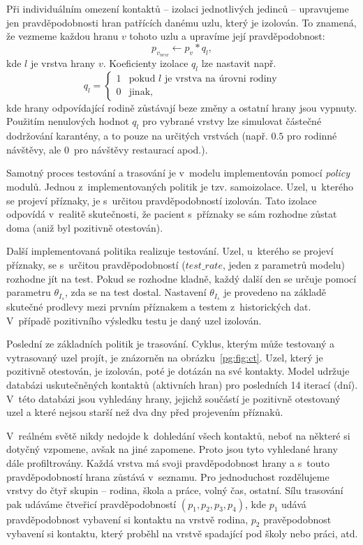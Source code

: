 Při individuálním omezení kontaktů -- izolaci jednotlivých jedinců -- upravujeme jen
pravděpodobnosti hran patřících danému uzlu, který je izolován. To znamená, že
vezmeme každou hranu $v$ tohoto uzlu a upravíme její pravděpodobnost:
$$
p_{v_{new}} \leftarrow p_{v} * q_l,
$$
kde  $l$  je vrstva hrany  $v$. 
Koeficienty izolace $q_l$ lze nastavit např.
$$
q_l =
\begin{cases}
  1  &  \mbox{pokud } l \mbox{ je vrstva na úrovni rodiny} \\
  0  &  \mbox{jinak,}
\end{cases}
$$
kde hrany odpovídající rodině zůstávají beze změny a ostatní hrany jsou vypnuty. Použitím nenulových hodnot $q_l$ pro vybrané vrstvy lze simulovat částečné dodržování karantény, a to pouze na určitých vrstvách (např. $0.5$ pro rodinné návštěvy, ale $0$~pro návštěvy restaurací apod.). 


Samotný proces testování a trasování je v~modelu implementován pomocí {\em policy} modulů. Jednou z~implementovaných politik je tzv. samoizolace. Uzel,
u~kterého se projeví příznaky, je s~určitou pravděpodobností izolován. Tato
izolace odpovídá v~realitě skutečnosti, že pacient s~příznaky se sám rozhodne
zůstat doma (aniž byl pozitivně otestován).

Další implementovaná politika realizuje testování. Uzel, u~kterého se
projeví příznaky, se s~určitou pravděpodobností ($test\_rate$, jeden z parametrů modelu)
rozhodne jít na test. Pokud se rozhodne kladně, každý další den se
určuje pomocí parametru $\theta_{I_s}$, zda se na test
dostal. Nastavení $\theta_{I_s}$ je provedeno na základě skutečné
prodlevy mezi prvním příznakem a testem z~historických dat. V~případě
pozitivního výsledku testu je daný uzel izolován.

Poslední ze základních politik je trasování. Cyklus, kterým může testovaný a
vytrasovaný uzel projít, je znázorněn na obrázku~\ref{pg:fig:ct}. Uzel, který je
pozitivně otestován, je izolován, poté je dotázán na své kontakty. Model udržuje
databázi uskutečněných kontaktů (aktivních hran) pro posledních 14 iterací (dní). V~této databázi jsou vyhledány hrany, jejichž součástí je pozitivně
otestovaný uzel a které nejsou starší než dva dny před projevením příznaků.

V~reálném světě nikdy nedojde k~dohledání všech kontaktů, neboť na některé si dotyčný vzpomene, avšak na jiné zapomene. Proto jsou tyto vyhledané hrany dále
profiltrovány. Každá vrstva má svoji pravděpodobnost  hrany a s~touto
pravděpodobností hrana zůstává v~seznamu. Pro jednoduchost rozdělujeme vrstvy
do čtyř skupin -- rodina, škola a práce, volný čas, ostatní. Sílu trasování pak
udáváme čtveřicí pravděpodobností $(p_1, p_2, p_3, p_4)$, kde 
$p_1$ udává pravděpodobnost vybavení si kontaktu na vrstvě rodina, $p_2$
pravěpodobnost vybavení si kontaktu, který proběhl na vrstvě spadající pod školy
nebo práci, atd.



